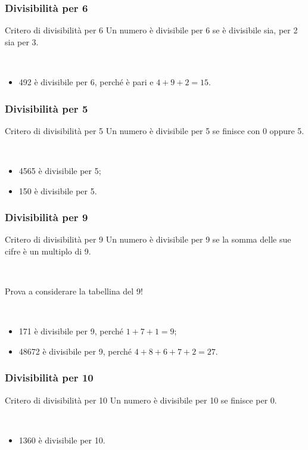 \documentclass[]{beamer}
\theoremstyle{plain}
\begin{document}
\begin{frame}
\frametitle{Divisibilità per 6}
\begin{block}{Critero di divisibilità per 6}
  Un numero è divisibile per 6 se è divisibile sia, per 2 sia per 3.
\end{block}\pause

~

\begin{itemize}
  \item 492 è divisibile per 6, perché è pari e $ 4 + 9 + 2 = 15 $.
\end{itemize}
\end{frame}


\begin{frame}
\frametitle{Divisibilità per 5}
\begin{block}{Critero di divisibilità per 5}
  Un numero è divisibile per 5 se finisce con 0 oppure 5.
\end{block}\pause

~

\begin{itemize}
  \item 4565 è divisibile per 5;\pause
  \item 150 è divisibile per 5.
\end{itemize}
\end{frame}


\begin{frame}
\frametitle{Divisibilità per 9}
\begin{block}{Critero di divisibilità per 9}
  Un numero è divisibile per 9 se la somma delle sue cifre è un multiplo di 9.

  ~

  Prova a considerare la tabellina del 9!
\end{block}\pause

~

\begin{itemize}
  \item 171 è divisibile per 9, perché $ 1+ 7+ 1 = 9 $;\pause
  \item 48672 è divisibile per 9, perché $ 4 + 8+6+ 7+ 2 = 27 $.
\end{itemize}
\end{frame}


\begin{frame}
\frametitle{Divisibilità per 10}
\begin{block}{Critero di divisibilità per 10}
  Un numero è divisibile per 10 se finisce per 0.
\end{block}\pause

~

\begin{itemize}
  \item 1360 è divisibile per 10.
\end{itemize}
\end{frame}
\end{document}
